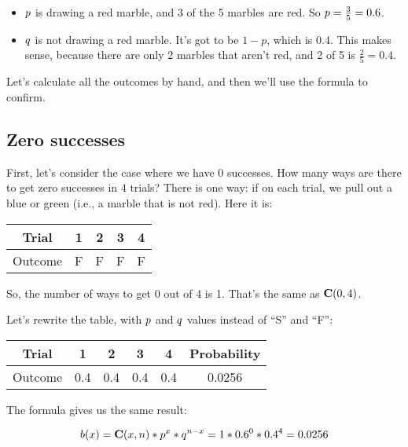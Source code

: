 \documentclass[../../../main.tex]{subfiles}
\begin{document}
\begin{itemize}
  \item $\success/$ is drawing a red marble, and 3 of the 5 marbles are red. So $\success/ = \frac{3}{5} = 0.6$.
  \item $\failure/$ is not drawing a red marble. It's got to be $1 - p$, which is $0.4$. This makes sense, because there are only 2 marbles that aren't red, and 2 of 5 is $\frac{2}{5} = 0.4$.
\end{itemize}

Let's calculate all the outcomes by hand, and then we'll use the formula to confirm.


\subsection{Zero successes}

First, let's consider the case where we have 0 successes. How many ways are there to get zero successes in 4 trials? There is one way: if on each trial, we pull out a blue or green (i.e., a marble that is not red). Here it is:

\begin{center}
  \begin{tabular}{| c | c | c | c | c |}
    \hline
    \textbf{Trial} & \textbf{1} & \textbf{2} & \textbf{3} & \textbf{4} \\ \hline
  Outcome & F & F & F & F \\ \hline
  \end{tabular}
\end{center}

\noindent
So, the number of ways to get 0 out of 4 is 1. That's the same as $\mathbf{C}(0, 4)$. 

Let's rewrite the table, with $\success/$ and $\failure/$ values instead of ``S'' and ``F'':

\begin{center}
  \begin{tabular}{| c | c | c | c | c | c |}
    \hline
    \textbf{Trial} & \textbf{1} & \textbf{2} & \textbf{3} & \textbf{4} & \textbf{Probability} \\ \hline
  Outcome & 0.4 & 0.4 & 0.4 & 0.4 & 0.0256 \\ \hline
  \end{tabular}
\end{center}

\noindent
The formula gives us the same result:

\begin{equation*}
  \Binom{\RandVarVal/} = \combs{\RandVarVal/}{n} * p^{\RandVarVal/} * q^{n - \RandVarVal/} = 1 * 0.6^{0} * 0.4^{4} = 0.0256
\end{equation*}
\end{document}
